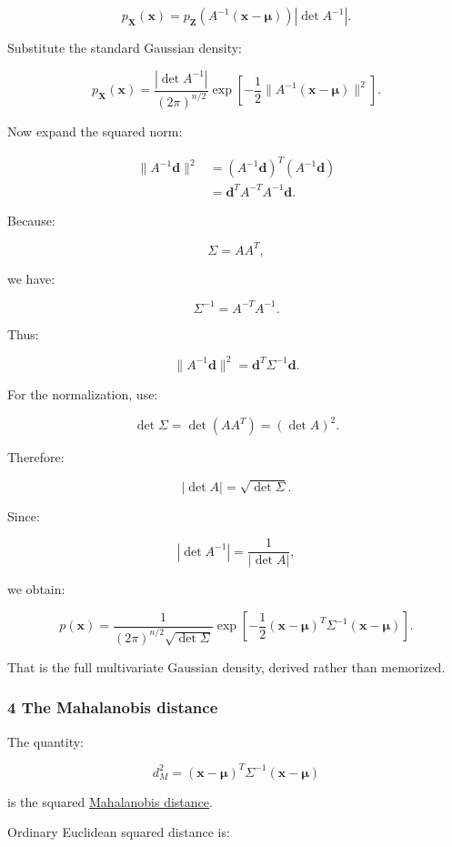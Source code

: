\[
 p_{\mathbf X}(\mathbf x) = p_{\mathbf Z}(A^{-1}(\mathbf x-\boldsymbol\mu)) |\det A^{-1}|.
\]

Substitute the standard Gaussian density:

\[
 p_{\mathbf X}(\mathbf x) = \frac{|\det A^{-1}|}{(2\pi)^{n/2}} \exp\left[ -\frac12 \|A^{-1}(\mathbf x-\boldsymbol\mu)\|^2 \right].
\]

Now expand the squared norm:

\[
 \begin{aligned} \|A^{-1}\mathbf d\|^2 &=(A^{-1}\mathbf d)^T(A^{-1}\mathbf d)\\ &=\mathbf d^TA^{-T}A^{-1}\mathbf d. \end{aligned}
\]

Because:

\[
 \Sigma=AA^T,
\]

we have:

\[
 \Sigma^{-1}=A^{-T}A^{-1}.
\]

Thus:

\[
 \|A^{-1}\mathbf d\|^2 = \mathbf d^T\Sigma^{-1}\mathbf d.
\]

For the normalization, use:

\[
 \det\Sigma= \det(AA^T) =(\det A)^2.
\]

Therefore:

\[
 |\det A|=\sqrt{\det\Sigma}.
\]

Since:

\[
 |\det A^{-1}|=\frac1{|\det A|},
\]

we obtain:

\[
 \boxed{ p(\mathbf x)= \frac1{(2\pi)^{n/2}\sqrt{\det\Sigma}} \exp\left[ -\frac12(\mathbf x-\boldsymbol\mu)^T \Sigma^{-1}(\mathbf x-\boldsymbol\mu) \right] }.
\]

That is the full multivariate Gaussian density, derived rather than memorized.

\subsubsection{4 The Mahalanobis distance}\label{02-foundations-ii-ch024-the-mahalanobis-distance}

The quantity:

\[
 \boxed{ d_M^2= (\mathbf x-\boldsymbol\mu)^T \Sigma^{-1} (\mathbf x-\boldsymbol\mu) }
\]

is the squared \hyperref[02-foundations-ii-ch024-waiting-times-event-counts-and-covariance-geometry]{Mahalanobis distance}.

Ordinary Euclidean squared distance is:

